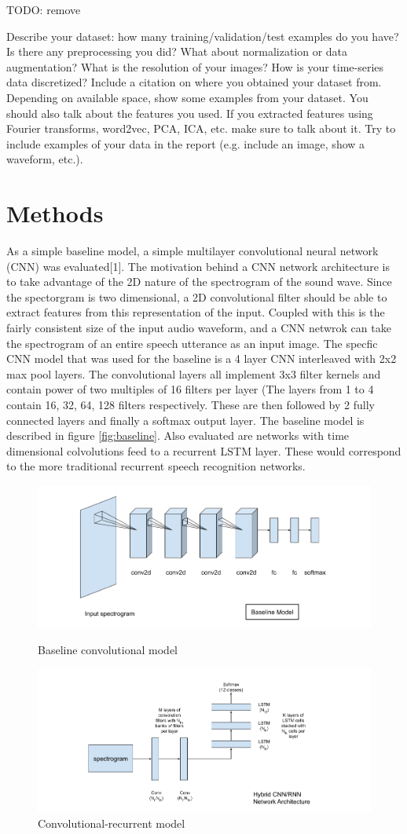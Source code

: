 \documentclass{article}
\begin{document}
TODO: remove

Describe your dataset: how many training/validation/test examples do you have? Is there
any preprocessing you did? What about normalization or data augmentation? What is the
resolution of your images? How is your time-series data discretized? Include a citation on
where you obtained your dataset from. Depending on available space, show some examples
from your dataset. You should also talk about the features you used. If you extracted
features using Fourier transforms, word2vec, PCA,
ICA, etc. make sure to talk about it. Try to include examples of your data in the report
(e.g. include an image, show a waveform, etc.).



\section{ Methods }
As a simple baseline model, a simple multilayer convolutional neural
network (CNN) was evaluated[1]. The motivation behind a CNN network
architecture is to take advantage of the 2D nature of the spectrogram
of the sound wave. Since the spectorgram is two dimensional, a 2D
convolutional filter should be able to extract features from this
representation of the input. Coupled with this is the fairly
consistent size of the input audio waveform, and a CNN netwrok can
take the spectrogram of an entire speech utterance as an input
image. The specfic CNN model that was used for the baseline is a 4
layer CNN interleaved with 2x2 max pool layers. The convolutional
layers all implement 3x3 filter kernels and contain power of two
multiples of 16 filters per layer (The layers from 1 to 4 contain
16, 32, 64, 128 filters respectively. These are then followed by 2
fully connected layers and finally a softmax output layer. The
baseline model is described in figure \ref{fig:baseline}. Also
evaluated are networks with time dimensional colvolutions feed to a
recurrent LSTM layer. These would correspond to the more traditional
recurrent speech recognition networks.

\begin{figure}
  \includegraphics[width=.48\textwidth]{images/baseline}
  \caption{Baseline convolutional model}
  \label{fig:baseline}
  \includegraphics[width=.48\textwidth]{images/crnn}
  \caption{Convolutional-recurrent model}
  \label{fig:crnn}
\end{figure}
\end{document}
